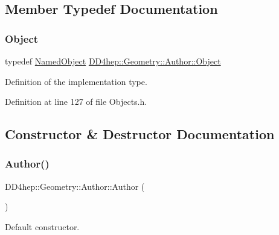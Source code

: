 \subsection{Member Typedef Documentation}
\hypertarget{class_d_d4hep_1_1_geometry_1_1_author_a253185ac4c6734b22d0b2f6b8161bf11}{}\label{class_d_d4hep_1_1_geometry_1_1_author_a253185ac4c6734b22d0b2f6b8161bf11} 
\subsubsection{\texorpdfstring{Object}{Object}}
{\footnotesize\ttfamily typedef \hyperlink{class_d_d4hep_1_1_named_object}{Named\+Object} \hyperlink{class_d_d4hep_1_1_geometry_1_1_author_a253185ac4c6734b22d0b2f6b8161bf11}{D\+D4hep\+::\+Geometry\+::\+Author\+::\+Object}}



Definition of the implementation type. 



Definition at line 127 of file Objects.\+h.



\subsection{Constructor \& Destructor Documentation}
\hypertarget{class_d_d4hep_1_1_geometry_1_1_author_a2803ac1dacb60ce706d59c4e1378f93c}{}\label{class_d_d4hep_1_1_geometry_1_1_author_a2803ac1dacb60ce706d59c4e1378f93c} 
\subsubsection{\texorpdfstring{Author()}{Author()}\hspace{0.1cm}{\footnotesize\ttfamily [1/4]}}
{\footnotesize\ttfamily D\+D4hep\+::\+Geometry\+::\+Author\+::\+Author (\begin{DoxyParamCaption}{ }\end{DoxyParamCaption})\hspace{0.3cm}{\ttfamily [inline]}}



Default constructor. 



